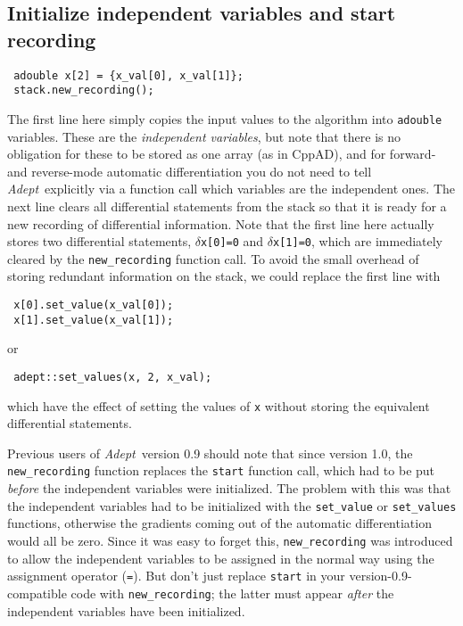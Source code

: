 \documentclass[a4,oneside]{book}
\def\codesize{\small}
\def\Adept{\emph{Adept}}
\def\code#1{{\codesize\texttt{#1}}}
\begin{document}
\subsection{Initialize independent variables and start recording}
\begin{lstlisting}
 adouble x[2] = {x_val[0], x_val[1]};
 stack.new_recording();
\end{lstlisting}
The first line here simply copies the input values to the algorithm
into \code{adouble} variables. These are the \emph{independent
  variables}, but note that there is no obligation for these to be
stored as one array (as in CppAD), and for forward- and reverse-mode
automatic differentiation you do not need to tell \Adept\ explicitly
via a function call which variables are the independent ones. The next
line clears all differential statements from the stack so that it is
ready for a new recording of differential information.
%
Note that the first line here actually stores two differential
statements, $\delta$\code{x[0]=0} and $\delta$\code{x[1]=0}, which are
immediately cleared by the \code{new\_recording} function call.  To
avoid the small overhead of storing redundant information on the
stack, we could replace the first line with 
\begin{lstlisting}
 x[0].set_value(x_val[0]);
 x[1].set_value(x_val[1]);
\end{lstlisting}
or
\begin{lstlisting}
 adept::set_values(x, 2, x_val);
\end{lstlisting}
which have the effect of setting the values of \code{x} without storing
the equivalent differential statements.

Previous users of \Adept\ version 0.9 should note that since version
1.0, the \code{new\_recording} function replaces the \code{start}
function call, which had to be put \emph{before} the independent
variables were initialized.  The problem with this was that the
independent variables had to be initialized with the \code{set\_value}
or \code{set\_values} functions, otherwise the gradients coming out of
the automatic differentiation would all be zero.  Since it was easy to
forget this, \code{new\_recording} was introduced to allow the
independent variables to be assigned in the normal way using the
assignment operator (\code{=}).  But don't just replace \code{start}
in your version-0.9-compatible code with \code{new\_recording}; the
latter must appear \emph{after} the independent variables have been
initialized.
\end{document}
